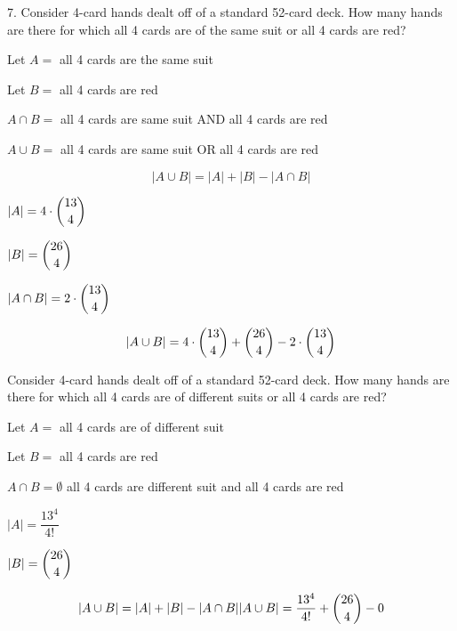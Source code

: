 \documentclass[openany, 11pt]{book}
\begin{document}
\begin{exercise}{}{}7. Consider 4-card hands dealt off of a standard 52-card deck.
	How many hands are there for which all 4 cards are of the same suit or all 4
	cards are red?
	\begin{alist}
		\item Let $A=$ all 4 cards are the same suit
		\item Let $B=$ all 4 cards are red
		\item $A\cap B=$ all 4 cards are same suit AND all 4 cards are red
		\item $A\cup B=$ all 4 cards are same suit OR all 4 cards are red
		\item
		$$
			|A \cup B | = |A| + |B| - |A \cap B|
		$$
		\item $|A| = 4\cdot\dbinom{13}{4}$
		\item $|B| = \dbinom{26}{4}$
		\item $|A\cap B| = 2\cdot\dbinom{13}{4}$
		\item
		$$
			|A \cup B | = 4\cdot\dbinom{13}{4} + \dbinom{26}{4} - 2\cdot\dbinom{13}{4}
		$$
	\end{alist}
\end{exercise}

\begin{exercise}{}{}
	Consider 4-card hands dealt off of a standard 52-card deck.
	How many hands are there for which all 4 cards are of different suits or all
	4 cards are red?
	\begin{alist}
		\item Let $A=$ all 4 cards are of different suit
		\item Let $B=$ all 4 cards are red
		\item $A\cap B=\emptyset$ all 4 cards are different suit and all 4 cards are red
		\item $|A| = \dfrac{13^4}{4!}$
		\item $|B| = \dbinom{26}{4}$
		\item
		$$
			|A \cup B | = |A| + |B| - |A \cap B|
			|A \cup B | = \dfrac{13^4}{4!} + \dbinom{26}{4} - 0
		$$
	\end{alist}
\end{exercise}
\end{document}
